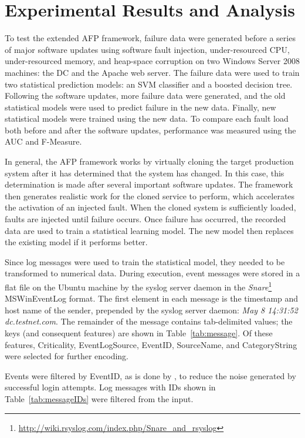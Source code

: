 \section{Experimental Results and Analysis} \label{chapter4}
To test the extended \ac{AFP} framework, failure data were generated before a
series of major software updates using software fault injection,
under-resourced \ac{CPU}, under-resourced memory, and heap-space corruption on
two Windows Server 2008 machines: the \ac{DC} and the Apache web server.  The
failure data were used to train two statistical prediction models: an \ac{SVM}
classifier and a boosted decision tree.  Following the software updates, more
failure data were generated, and the old statistical models were used to
predict failure in the new data.  Finally, new statistical models were trained
using the new data.  To compare each fault load both before and after the
software updates, performance was measured using the \ac{AUC} and F-Measure.

In general, the \ac{AFP} framework works by virtually cloning the target
production system after it has determined that the system has changed.  In this
case, this determination is made after several important software updates.  The
framework then generates realistic work for the cloned service to perform,
which accelerates the activation of an injected fault.  When the cloned system
is sufficiently loaded, faults are injected until failure occurs.  Once failure
has occurred, the recorded data are used to train a statistical learning model.
The new model then replaces the existing model if it performs better.

Since log messages were used to train the statistical model, they needed to be
transformed to numerical data.  During execution, event messages were stored in
a flat file on the Ubuntu machine by the syslog server daemon in the
\emph{Snare}\footnote{\url{http://wiki.rsyslog.com/index.php/Snare\_and\_rsyslog}}
MSWinEventLog format.  The first element in each message is the timestamp and
host name of the sender, prepended by the syslog server daemon: \emph{May 8
14:31:52 dc.testnet.com}.  The remainder of the message contains tab-delimited
values; the keys (and consequent features) are shown in
Table~\ref{tab:message}.  Of these features, Criticality, EventLogSource,
EventID, SourceName, and CategoryString were selected for further encoding.

\tabMessage

Events were filtered by EventID, as is done by \citet{fulp2008}, to reduce the
noise generated by successful login attempts.  Log messages with IDs shown in
Table~\ref{tab:messageIDs} were filtered from the input.  

